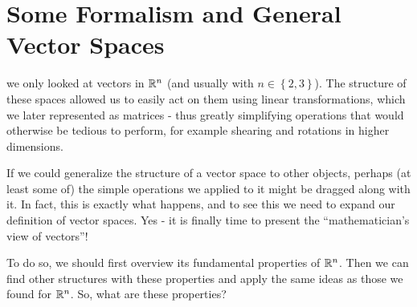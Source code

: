 \section{Some Formalism and General Vector Spaces}
 we only looked at vectors in $\Rs[n]$ (and usually with $n\in\left\{2,3\right\}$). The structure of these spaces allowed us to easily act on them using linear transformations, which we later represented as matrices - thus greatly simplifying operations that would otherwise be tedious to perform, for example shearing and rotations in higher dimensions.

If we could generalize the structure of a vector space to other objects, perhaps (at least some of) the simple operations we applied to it might be dragged along with it. In fact, this is exactly what happens, and to see this we need to expand our definition of vector spaces. Yes - it is finally time to present the \enquote{mathematician's view of vectors}!

To do so, we should first overview its fundamental properties of $\Rs[n]$. Then we can find other structures with these properties and apply the same ideas as those we found for $\Rs[n]$. So, what are these properties?

